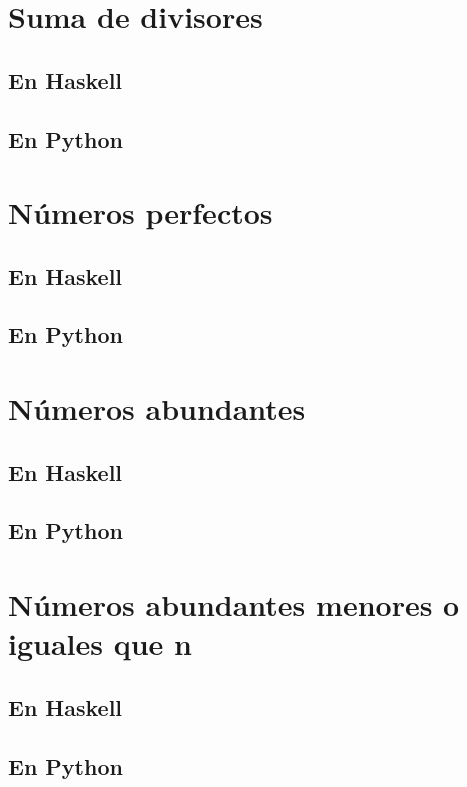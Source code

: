 \documentclass[a4paper,12pt,twoside]{book}
\begin{document}
\section{Suma de divisores}
\subsection*{En Haskell}
\subsection*{En Python}

\section{Números perfectos}
\subsection*{En Haskell}
\subsection*{En Python}

\section{Números abundantes}
\subsection*{En Haskell}
\subsection*{En Python}

\section{Números abundantes menores o iguales que n}
\subsection*{En Haskell}
\subsection*{En Python}
\end{document}
